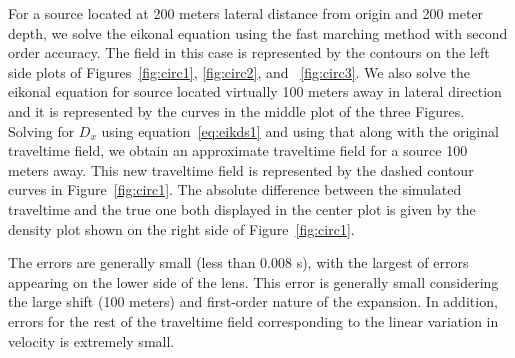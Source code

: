For a source located at 200 meters lateral distance from origin and
200 meter depth, we solve the eikonal equation using the fast marching
method with second order accuracy. The   field in this case is
represented by the   contours on the left side plots of
Figures~\ref{fig:circ1}, \ref{fig:circ2}, and~ \ref{fig:circ3}. We
also solve the eikonal equation for source located virtually 100
meters away in lateral direction and it is represented by the   curves in the
middle plot of the three Figures. Solving for $D_x$ using
equation~\ref{eq:eikds1} and using that along with the original
traveltime field, we obtain an approximate traveltime field for a
source 100 meters away. This new traveltime field is represented by
the dashed contour curves in Figure~\ref{fig:circ1}. The absolute
difference between the simulated traveltime and the true one both
displayed in the center plot is given by the density plot shown on the
right side of Figure~\ref{fig:circ1}.


The errors are generally small (less than 0.008 s), with the largest
of errors appearing on the lower side of the lens. This error is
generally small considering the large shift (100 meters) and
first-order nature of the expansion. In addition, errors for the rest
of the traveltime field corresponding to the linear variation in
velocity is extremely small.


